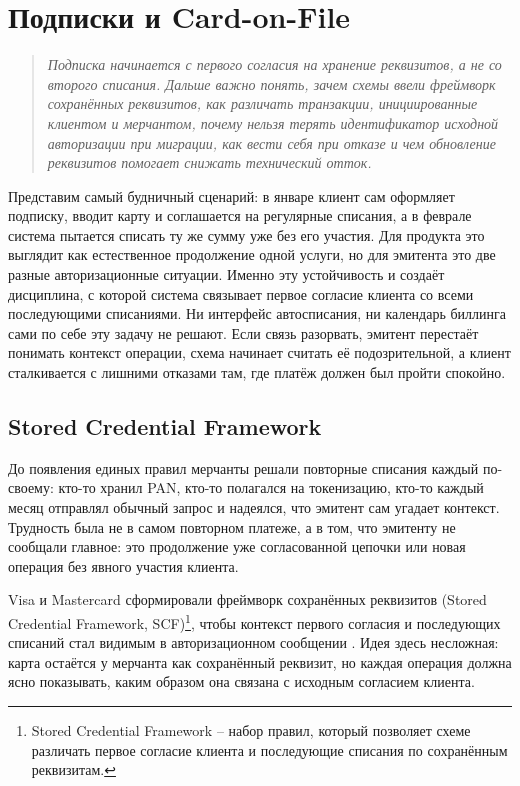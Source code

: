 
\chapter{Подписки и Card-on-File}
\label{ch:subscriptions}
\begin{quote}
  \itshape
  Подписка начинается с первого согласия на хранение реквизитов,
  а не со второго списания. Дальше важно понять, зачем схемы ввели
  фреймворк сохранённых реквизитов, как различать транзакции,
  инициированные клиентом и мерчантом, почему нельзя терять
  идентификатор исходной авторизации при миграции, как вести себя при
  отказе и чем обновление реквизитов помогает снижать технический
  отток.
\end{quote}

Представим самый будничный сценарий: в январе клиент сам оформляет
подписку, вводит карту и соглашается на регулярные списания, а в феврале
система пытается списать ту же сумму уже без его участия. Для продукта
это выглядит как естественное продолжение одной услуги, но для эмитента
это две разные авторизационные ситуации. Именно эту устойчивость
и создаёт дисциплина, с которой система связывает первое согласие
клиента со всеми последующими списаниями. Ни интерфейс автосписания,
ни календарь биллинга сами по себе эту задачу не решают. Если связь
разорвать, эмитент перестаёт понимать контекст операции, схема начинает
считать её подозрительной, а клиент сталкивается с лишними отказами там,
где платёж должен был пройти спокойно.

\section{Stored Credential Framework}
\label{sec:subscriptions-scf}

До появления единых правил мерчанты решали повторные списания каждый
по-своему: кто-то хранил PAN, кто-то полагался на токенизацию, кто-то
каждый месяц отправлял обычный запрос и надеялся, что эмитент сам
угадает контекст. Трудность была не в самом повторном платеже, а в том,
что эмитенту не сообщали главное: это продолжение уже согласованной
цепочки или новая операция без явного участия клиента.

Visa и Mastercard сформировали фреймворк сохранённых
реквизитов (Stored Credential Framework, SCF)\footnote{Stored Credential
Framework -- набор правил, который позволяет схеме различать первое
согласие клиента и последующие списания по сохранённым реквизитам.},
чтобы контекст первого согласия и последующих списаний стал видимым в
авторизационном сообщении \cite{visa-scf}\cite{mc-scf}. Идея
здесь несложная: карта остаётся у мерчанта как сохранённый реквизит, но
каждая операция должна ясно показывать, каким образом она связана с
исходным согласием клиента.

